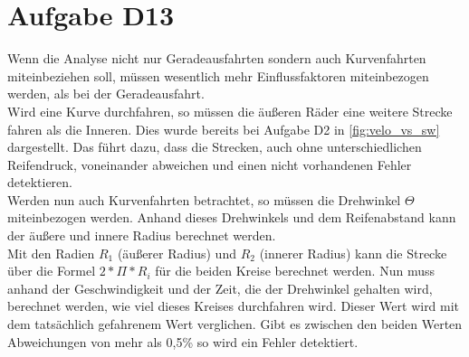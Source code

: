 \chapter{Aufgabe D13}

Wenn die Analyse nicht nur Geradeausfahrten sondern auch Kurvenfahrten miteinbeziehen soll, müssen wesentlich mehr Einflussfaktoren miteinbezogen werden, als bei der Geradeausfahrt.\\
Wird eine Kurve durchfahren, so müssen die äußeren Räder eine weitere Strecke fahren als die Inneren. Dies wurde bereits bei Aufgabe D2 in \autoref{fig:velo_vs_sw} dargestellt. Das führt dazu, dass die Strecken, auch ohne unterschiedlichen Reifendruck, voneinander abweichen und einen nicht vorhandenen Fehler detektieren.\\
Werden nun auch Kurvenfahrten betrachtet, so müssen die Drehwinkel $\Theta$ miteinbezogen werden. Anhand dieses Drehwinkels und dem Reifenabstand kann der äußere und innere Radius berechnet werden. \\
Mit den Radien $R_1$ (äußerer Radius) und $R_2$ (innerer Radius) kann die Strecke über die Formel $2*\Pi*R_i$ für die beiden Kreise berechnet werden. Nun muss anhand der Geschwindigkeit und der Zeit, die der Drehwinkel gehalten wird, berechnet werden, wie viel dieses Kreises durchfahren wird. Dieser Wert wird mit dem tatsächlich gefahrenem Wert verglichen. Gibt es zwischen den beiden Werten Abweichungen von mehr als 0,5\% so wird ein Fehler detektiert.
